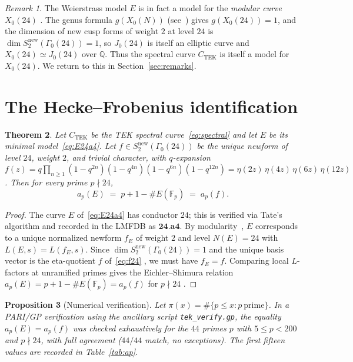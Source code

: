\documentclass[11pt]{amsart}
\newtheorem{theorem}{Theorem}
\newtheorem{proposition}[theorem]{Proposition}
\theoremstyle{definition}
\theoremstyle{remark}
\newtheorem{remark}[theorem]{Remark}
\newcommand{\Q}{\mathbb{Q}}
\newcommand{\F}{\mathbb{F}}
\newcommand{\TEK}{\mathrm{TEK}}
\begin{document}
\begin{remark}\label{rem:X024}
The Weierstrass model \(E\) is in fact a model for the
\emph{modular curve} \(X_{0}(24)\) \cite{LMFDB}. The genus formula
\(g(X_{0}(N))\) (see~\cite[Thm.~3.1.1]{DiamondShurman2005}) gives
\(g(X_{0}(24)) = 1\), and the dimension of new cusp forms of weight
\(2\) at level \(24\) is
\(\dim S_{2}^{\mathrm{new}}(\Gamma_{0}(24)) = 1\), so \(J_{0}(24)\)
is itself an elliptic curve and \(X_{0}(24) \simeq J_{0}(24)\) over
\(\Q\). Thus the spectral curve \(C_{\TEK}\) is itself a model for
\(X_{0}(24)\). We return to this in Section~\ref{sec:remarks}.
\end{remark}

\section{The Hecke--Frobenius identification}\label{sec:match}

\begin{theorem}\label{thm:match}
Let \(C_{\TEK}\) be the TEK spectral curve~\eqref{eq:spectral} and
let \(E\) be its minimal model~\eqref{eq:E24a4}. Let
\(f \in S_{2}^{\mathrm{new}}(\Gamma_{0}(24))\) be the unique newform
of level \(24\), weight \(2\), and trivial character, with
\(q\)-expansion
\(f(z) = q\prod_{n\ge 1}(1 - q^{2n})(1 - q^{4n})(1 - q^{6n})
(1 - q^{12n}) =
\eta(2z)\,\eta(4z)\,\eta(6z)\,\eta(12z)\). Then for every prime
\(p \nmid 24\),
\[
  a_{p}(E)
  \;=\; p + 1 - \#E(\F_{p})
  \;=\; a_{p}(f).
\]
\end{theorem}

\begin{proof}
The curve \(E\) of~\eqref{eq:E24a4} has conductor \(24\); this is
verified via Tate's algorithm \cite[Ch.~IV]{Silverman1994} and
recorded in the LMFDB as \(\mathbf{24.a4}\). By
modularity~\cite{Wiles1995, TaylorWiles1995, BCDT2001}, \(E\)
corresponds to a unique normalized newform \(f_{E}\) of weight \(2\)
and level \(N(E) = 24\) with \(L(E, s) = L(f_{E}, s)\). Since
\(\dim S_{2}^{\mathrm{new}}(\Gamma_{0}(24)) = 1\) and the unique
basis vector is the eta-quotient \(f\) of~\eqref{eq:f24}
\cite{LMFDB}, we must have \(f_{E} = f\). Comparing local
\(L\)-factors at unramified primes gives the Eichler--Shimura
relation
\(a_{p}(E) = p + 1 - \#E(\F_{p}) = a_{p}(f)\) for \(p \nmid 24\)
\cite[Ch.~7, Thm.~7.6]{Shimura1971}.
\end{proof}

\begin{proposition}[Numerical verification]\label{prop:numerical}
Let \(\pi(x) = \#\{p \le x : p\ \mathrm{prime}\}\). In a PARI/GP
verification using the ancillary script \texttt{tek\_verify.gp},
the equality \(a_{p}(E) = a_{p}(f)\) was checked exhaustively for
the \(44\) primes \(p\) with \(5 \le p < 200\) and \(p \nmid 24\),
with full agreement (\(44/44\) match, no exceptions). The first
fifteen values are recorded in Table~\ref{tab:ap}.
\end{proposition}
\end{document}
